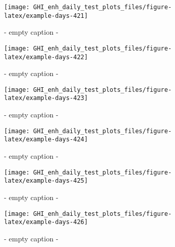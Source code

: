 \documentclass[
  10pt,
  a4paper,oneside]{article}
\begin{document}
\begin{figure}[H]

{\centering \texttt{[image: GHI\_enh\_daily\_test\_plots\_files/figure-latex/example-days-421]} 

}

\caption{ - empty caption - }\label{fig:example-days-421}
\end{figure}

\begin{figure}[H]

{\centering \texttt{[image: GHI\_enh\_daily\_test\_plots\_files/figure-latex/example-days-422]} 

}

\caption{ - empty caption - }\label{fig:example-days-422}
\end{figure}

\begin{figure}[H]

{\centering \texttt{[image: GHI\_enh\_daily\_test\_plots\_files/figure-latex/example-days-423]} 

}

\caption{ - empty caption - }\label{fig:example-days-423}
\end{figure}

\begin{figure}[H]

{\centering \texttt{[image: GHI\_enh\_daily\_test\_plots\_files/figure-latex/example-days-424]} 

}

\caption{ - empty caption - }\label{fig:example-days-424}
\end{figure}

\begin{figure}[H]

{\centering \texttt{[image: GHI\_enh\_daily\_test\_plots\_files/figure-latex/example-days-425]} 

}

\caption{ - empty caption - }\label{fig:example-days-425}
\end{figure}

\begin{figure}[H]

{\centering \texttt{[image: GHI\_enh\_daily\_test\_plots\_files/figure-latex/example-days-426]} 

}

\caption{ - empty caption - }\label{fig:example-days-426}
\end{figure}
\end{document}
